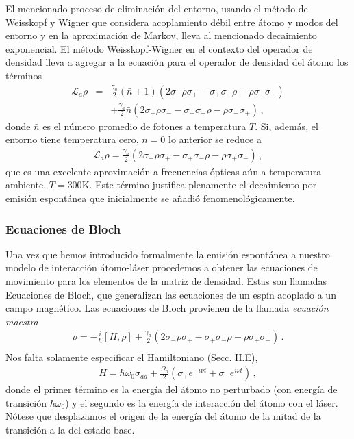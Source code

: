 \documentclass[twocolumn,aps,eqsecnum]{revtex4}
\begin{document}
El mencionado proceso de eliminaci\'on del entorno, usando el m\'etodo 
de Weisskopf y Wigner que considera acoplamiento d\'ebil entre \'atomo 
y modos del entorno y en la aproximaci\'on de Markov, lleva al mencionado 
decaimiento exponencial. El m\'etodo Weisskopf-Wigner en el contexto 
del operador de densidad lleva a agregar a la ecuaci\'on para el operador 
de densidad del \'atomo los t\'erminos 
%
\begin{eqnarray} 	\label{eq:mEq2LA_bb}
\mathcal{L}_a \rho &=& \frac{\gamma_a}{2} (\bar{n} +1) 
	\left( 2 \sigma_- \rho \sigma_+ -\sigma_+ \sigma_- \rho 
	-\rho \sigma_+ \sigma_- \right) 	\nonumber \\
	&& + \frac{\gamma_a}{2} \bar{n}  
	\left( 2 \sigma_+ \rho \sigma_- -\sigma_- \sigma_+ \rho 
	-\rho \sigma_- \sigma_+ \right)\,, 
\end{eqnarray}
donde $\bar{n}$ es el n\'umero promedio de fotones a temperatura 
$T$. Si, adem\'as, el entorno tiene temperatura cero, $\bar{n} =0$ lo 
anterior se reduce a 
%
\begin{eqnarray}
\mathcal{L}_a \rho = \frac{\gamma_a}{2} \left( 2 \sigma_- \rho \sigma_+ 
	-\sigma_+ \sigma_- \rho -\rho \sigma_+ \sigma_- \right) \,, 
\end{eqnarray}
que es una excelente aproximaci\'on a frecuencias \'opticas a\'un a 
temperatura ambiente, $T = 300$K. Este t\'ermino justifica plenamente 
el decaimiento por emisi\'on espont\'anea que inicialmente se a\~nadi\'o 
fenomenol\'ogicamente. 

\subsubsection{Ecuaciones de Bloch} 
Una vez que hemos introducido formalmente la emisi\'on espont\'anea a 
nuestro modelo de interacci\'on \'atomo-l\'aser procedemos a obtener las 
ecuaciones de movimiento para los elementos de la matriz de densidad. 
Estas son llamadas Ecuaciones de Bloch, que generalizan las ecuaciones 
de un esp\'in acoplado a un campo magn\'etico. Las ecuaciones de Bloch 
provienen de la llamada \textit{ecuaci\'on maestra} 
%
\begin{eqnarray}
\dot{\rho} = -\frac{i}{\hbar} [H,\rho]  +\frac{\gamma_a}{2} 
	\left( 2 \sigma_- \rho \sigma_+ -\sigma_+ \sigma_- \rho 
	-\rho \sigma_+ \sigma_- \right) \,. 	\nonumber \\
\end{eqnarray}
Nos falta solamente especificar el Hamiltoniano (Secc. II.E), 
%
\begin{eqnarray}
 H = \hbar \omega_0 \sigma_{aa} + \frac{\Omega_0}{2} 
	(\sigma_+ e^{-i\nu t} 	+\sigma_- e^{i\nu t}) \,,
\end{eqnarray}
donde el primer t\'ermino es la energ\'ia del \'atomo no perturbado (con 
energ\'ia de transici\'on $\hbar \omega_0$) y el segundo es la energ\'ia de 
interacci\'on del \'atomo con el l\'aser. N\'otese que desplazamos el origen 
de la energ\'ia del \'atomo de la mitad de la transici\'on a la del estado base.  
\end{document}

